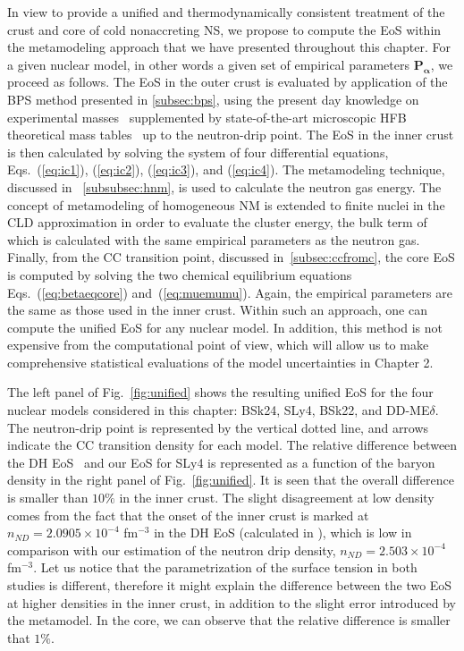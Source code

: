 In view to provide a unified and thermodynamically consistent treatment of the
crust and core of cold nonaccreting NS, we propose to compute the EoS within 
the metamodeling approach that we have presented throughout this chapter. For
a given nuclear model, in other words a given set of empirical parameters
$\bm{P_\alpha}$, we proceed as follows. The EoS in the outer crust is
evaluated by application of the BPS method presented in \ref{subsec:bps}, using 
the present day knowledge on experimental masses~\cite{Huang2017} supplemented 
by state-of-the-art microscopic HFB theoretical mass tables~\cite{Goriely2013} 
up to the neutron-drip point. The EoS in the inner crust is then calculated
by solving the system of four differential equations, Eqs.~(\ref{eq:ic1}),
(\ref{eq:ic2}), (\ref{eq:ic3}), and (\ref{eq:ic4}). The metamodeling technique,
discussed in ~\ref{subsubsec:hnm}, is used to calculate the neutron gas energy.
The concept of metamodeling of homogeneous NM is extended to finite nuclei in the
CLD approximation in order to evaluate the cluster energy, the bulk term of
which is calculated with the same empirical parameters as the neutron gas. 
Finally, from the CC transition point, discussed in~\ref{subsec:ccfromc}, the 
core EoS is computed by solving the two chemical equilibrium equations
Eqs.~(\ref{eq:betaeqcore}) and~(\ref{eq:muemumu}). Again, the empirical
parameters are the same as those used in the inner crust. Within such an 
approach, one can compute the unified EoS for any nuclear model.
In addition, this method is not expensive from the computational point of view,
which will allow us to make comprehensive statistical evaluations of the model
uncertainties in Chapter 2. 

The left panel of Fig.~\ref{fig:unified} shows the resulting unified EoS for
the four nuclear models considered in this chapter: BSk24, SLy4, BSk22, 
and DD-ME$\delta$. The neutron-drip point is represented by the vertical dotted
line, and arrows indicate the CC transition density for each model. 
The relative difference between the DH EoS~\cite{Douchin2001} and our EoS for
SLy4 is represented as a function of the baryon density in the right panel of
Fig.~\ref{fig:unified}. It is seen that the overall difference is smaller than 
$10\%$ in the inner crust. The slight disagreement at low density comes from 
the fact that the onset of the inner crust is marked at $n_{ND} = 2.0905 \times
10^{-4}$ fm$^{-3}$ in the DH EoS (calculated in \cite{Haensel1994}), which is 
low in comparison with our estimation of the neutron drip density, $n_{ND} = 
2.503\times 10^{-4}$ fm$^{-3}$. Let us notice that the parametrization of the
surface tension in both studies is different, therefore it might explain the 
difference between the two EoS at higher densities in the inner crust, in 
addition to the slight error introduced by the metamodel. In the core, we can
observe that the relative difference is smaller that $1\%$.

